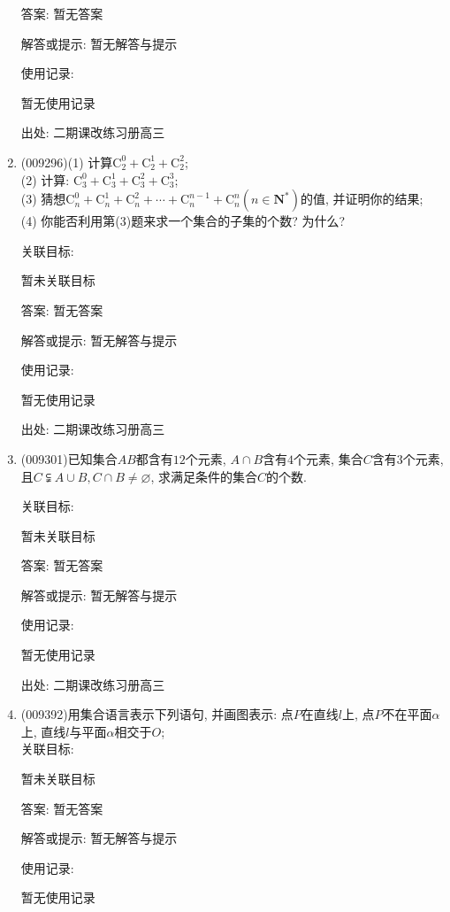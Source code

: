 \documentclass[10pt,a4paper]{article}
\begin{document}
\begin{enumerate}[1.]
答案: 暂无答案

解答或提示: 暂无解答与提示

使用记录:

暂无使用记录


出处: 二期课改练习册高三
\item { (009296)}(1) 计算$\mathrm{C}_2^0+\mathrm{C}_2^1+\mathrm{C}_2^2$;\\
(2) 计算: $\mathrm{C}_3^0+\mathrm{C}_3^1+\mathrm{C}_3^2+\mathrm{C}_3^3$;\\
(3) 猜想$\mathrm{C}_n^0+\mathrm{C}_n^1+\mathrm{C}_n^2+\cdots +\mathrm{C}_n^{n-1}+\mathrm{C}_n^n(n\in \mathbf{N}^*) $的值, 并证明你的结果;\\
(4) 你能否利用第(3)题来求一个集合的子集的个数? 为什么?


关联目标:

暂未关联目标

答案: 暂无答案

解答或提示: 暂无解答与提示

使用记录:

暂无使用记录


出处: 二期课改练习册高三
\item { (009301)}已知集合$AB$都含有$12$个元素, $A\cap B$含有$4$个元素, 集合$C$含有$3$个元素, 且$C\subsetneqq A\cup B,C\cap B\ne \varnothing$, 求满足条件的集合$C$的个数.


关联目标:

暂未关联目标

答案: 暂无答案

解答或提示: 暂无解答与提示

使用记录:

暂无使用记录


出处: 二期课改练习册高三
\item { (009392)}用集合语言表示下列语句, 并画图表示: 点$P$在直线$l$上, 点$P$不在平面$\alpha$上, 直线$l$与平面$\alpha$相交于$O$;\\


关联目标:

暂未关联目标

答案: 暂无答案

解答或提示: 暂无解答与提示

使用记录:

暂无使用记录



\end{enumerate}
\end{document}

